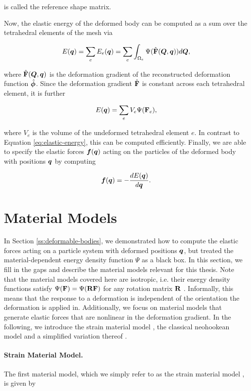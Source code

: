 \noindent is called the reference shape matrix.

Now, the elastic energy of the deformed body can be computed as a sum over the tetrahedral elements of the mesh via

\[
    E(\bm{q}) = \sum_e E_e(\bm{q}) = \sum_e \int_{\Omega_e} \Psi(\hat{\mathbf{F}}(\bm{Q}, \bm{q})) d\bm{Q},
\]

\noindent where $\hat{\mathbf{F}}(\bm{Q}, \bm{q})$ is the deformation gradient of the reconstructed deformation 
function $\hat{\bm{\phi}}$. Since the deformation gradient $\hat{\mathbf{F}}$ is constant across each tetrahedral element, 
it is further

\[
    E(\bm{q}) = \sum_e V_e \Psi(\mathbf{F}_e),
\]

\noindent where $V_e$ is the volume of the undeformed tetrahedral element $e$. In contrast to Equation \ref{eq:elastic-energy}, this can be computed efficiently. 
Finally, we are able to specify the elastic forces $\bm{f}(\bm{q})$ acting on the particles of the deformed body with positions $\bm{q}$ by computing

\[
    \bm{f}(\bm{q}) = -\frac{dE(\bm{\bm{q}})}{d\bm{q}}.
\]

\section{Material Models}\label{ss:material-models}
In Section \ref{ss:deformable-bodies}, we demonstrated how to compute the elastic forces acting on a particle system with deformed positions 
$\bm{q}$, but treated the material-dependent energy density function $\Psi$ as a black box. In this section, we fill in the gaps and describe the material
models relevant for this thesis. Note that the material models covered here are isotropic, i.e. their energy density functions satisfy $\Psi(\mathbf{F}) = 
\Psi(\mathbf{R}\mathbf{F})$ for any rotation matrix $\mathbf{R}$ \cite{sifakis2012}. Informally, this means that the response to a deformation is 
independent of the orientation the deformation is applied in. Additionally, we focus on material models that generate elastic forces that are nonlinear 
in the deformation gradient. In the following, we introduce the strain material model \cite{bouaziz2014}, the classical neohookean model and a simplified 
variation thereof \cite{smith2018}.

\paragraph{Strain Material Model.}
The first material model, which we simply refer to as the strain material model \cite{bouaziz2014}, is given by

